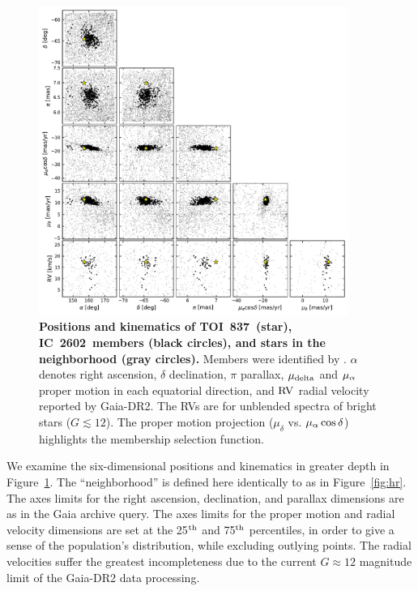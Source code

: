 \documentclass[12pt,twocolumn,tighten]{aastex62}
\newcommand{\tn}{TOI~837} %
\newcommand{\cn}{IC~2602} %
\begin{document}
\begin{figure}[t!]
	\begin{center}
		\leavevmode
		\includegraphics[width=0.9\textwidth]{f8.pdf}
	\end{center}
	\vspace{-0.7cm}
	\caption{ 
  {\bf Positions and kinematics of \tn\ (star), \cn\ members (black
  circles), and stars in the neighborhood (gray circles).} Members
  were identified by \citet{cantatgaudin_gaia_2018}.  $\alpha$ denotes
  right ascension, $\delta$ declination, $\pi$ parallax, $\mu_{\rm
  delta}$ and $\mu_{\rm \alpha}$ proper motion in each equatorial
  direction, and ${\rm RV}$ radial velocity reported by Gaia-DR2.  The
  RVs are for unblended spectra of bright stars ($G\lesssim 12$).  The
  proper motion projection ($\mu_{\delta}$ vs{.} $\mu_{\rm
  \alpha}\cos\delta$) highlights the membership selection function.
  \label{fig:full_kinematics}
	}
\end{figure}

We examine the six-dimensional positions and kinematics in greater
depth in Figure~\ref{fig:full_kinematics}.  The ``neighborhood'' is
defined here identically to as in Figure~\ref{fig:hr}.  The axes
limits for the right ascension, declination, and parallax dimensions
are as in the Gaia archive query.  The axes limits for the proper
motion and radial velocity dimensions are set at the 25$^{\rm th}$ and
75$^{\rm th}$ percentiles, in order to give a sense of the
population's distribution, while excluding outlying points.  The
radial velocities suffer the greatest incompleteness due to the
current $G\approx12$ magnitude limit of the Gaia-DR2 data processing.
\end{document}

